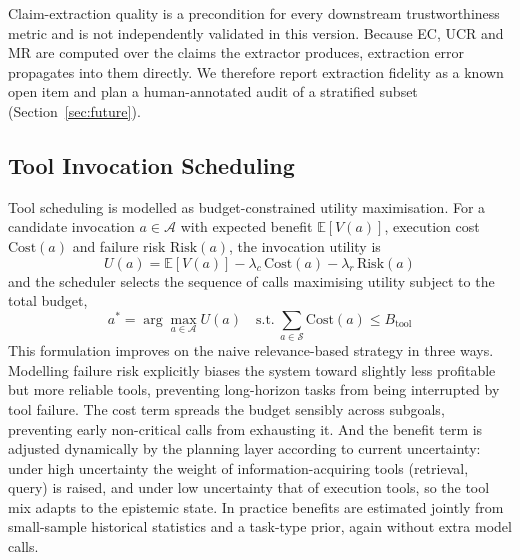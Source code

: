 \documentclass[journal,10pt,a4paper]{IEEEtran}
\begin{document}
Claim-extraction quality is a precondition for every downstream trustworthiness metric and is not independently validated in this version. Because EC, UCR and MR are computed over the claims the extractor produces, extraction error propagates into them directly. We therefore report extraction fidelity as a known open item and plan a human-annotated audit of a stratified subset (Section~\ref{sec:future}).

\subsection{Tool Invocation Scheduling}
\label{sec:tool}
Tool scheduling is modelled as budget-constrained utility maximisation. For a candidate invocation $a\in\mathcal{A}$ with expected benefit $\mathbb{E}[V(a)]$, execution cost $\mathrm{Cost}(a)$ and failure risk $\mathrm{Risk}(a)$, the invocation utility is
\begin{equation}
U(a)=\mathbb{E}[V(a)]-\lambda_c\,\mathrm{Cost}(a)-\lambda_r\,\mathrm{Risk}(a)
\end{equation}
and the scheduler selects the sequence of calls maximising utility subject to the total budget,
\begin{equation}
a^{*}=\arg\max_{a\in\mathcal{A}}U(a)\quad \text{s.t.}\ \sum_{a\in\mathcal{S}}\mathrm{Cost}(a)\le B_{\mathrm{tool}}
\end{equation}
This formulation improves on the naive relevance-based strategy in three ways. Modelling failure risk explicitly biases the system toward slightly less profitable but more reliable tools, preventing long-horizon tasks from being interrupted by tool failure. The cost term spreads the budget sensibly across subgoals, preventing early non-critical calls from exhausting it. And the benefit term is adjusted dynamically by the planning layer according to current uncertainty: under high uncertainty the weight of information-acquiring tools (retrieval, query) is raised, and under low uncertainty that of execution tools, so the tool mix adapts to the epistemic state. In practice benefits are estimated jointly from small-sample historical statistics and a task-type prior, again without extra model calls.
\end{document}

